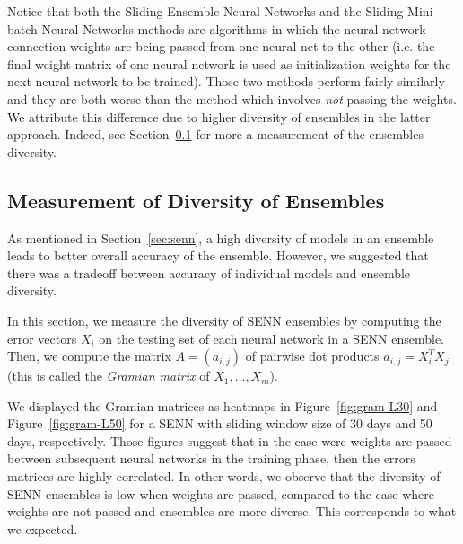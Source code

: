 \documentclass[conference]{IEEEtran}
\begin{document}
		Notice that both the Sliding Ensemble Neural Networks and the Sliding Mini-batch Neural Networks methods are algorithms in which the neural network connection weights are being passed from one neural net to the other (i.e. the final weight matrix of one neural network is used as initialization weights for the next neural network to be trained). Those two methods perform fairly similarly and they are both worse than the method which involves \emph{not} passing the weights. We attribute this difference due to higher diversity of ensembles in the latter approach. Indeed, see Section~\ref{sec:measurement-diversity} for more a measurement of the ensembles diversity.
		
		\subsection{Measurement of Diversity of Ensembles}
		\label{sec:measurement-diversity}
		
		As mentioned in Section~\ref{sec:senn}, a high diversity of models in an ensemble leads to better overall accuracy of the ensemble. However, we suggested that there was a tradeoff between accuracy of individual models and ensemble diversity.
		
		In this section, we measure the diversity of SENN ensembles by computing the error vectors $X_i$ on the testing set of each neural network in a SENN ensemble. Then, we compute the matrix $A = (a_{i,j})$ of pairwise dot products $a_{i,j} = X_i^T X_j$ (this is called the \emph{Gramian matrix} of $X_1, \ldots, X_m$).
		
		We displayed the Gramian matrices as heatmaps in Figure~\ref{fig:gram-L30} and Figure~\ref{fig:gram-L50} for a SENN with sliding window size of 30 days and 50 days, respectively. Those figures suggest that in the case were weights are passed between subsequent neural networks in the training phase, then the errors matrices are highly correlated. In other words, we observe that the diversity of SENN ensembles is low when weights are passed, compared to the case where weights are not passed and ensembles are more diverse. This corresponds to what we expected.
		
		
\end{document}
